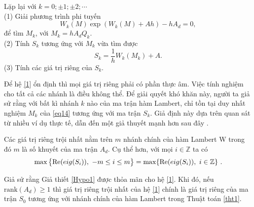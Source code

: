 \begin{tht} \label{tht1}
	Lặp lại với $k = 0;\pm 1; \pm2; \cdots$\\
	(1) Giải phương trình phi tuyến
	\begin{equation}\label{eq14}
		W_k(M)\exp (W_k(M)+Ah)-h A_d=0,
	\end{equation}
	để tìm $M_k$, với $M_k = h A_d Q_k$.\\
	(2) Tính $S_k$ tương ứng với $M_k$ vừa tìm được
	\begin{equation}\label{eq15}
		S_k= \dfrac{1}{h }W_k(M_k)+A.
	\end{equation}
	(3) Tính các giá trị riêng của $S_k$.
\end{tht}

\noindent Để hệ \eqref{1} ổn định thì mọi giá trị riêng phải có phần thực âm. Việc tính nghiệm cho tất cả các nhánh là điều không thể. Để giải quyết khó khăn này, người ta giả sử rằng với bất kì nhánh $k$ nào của ma trận hàm Lambert, chỉ tồn tại duy nhất nghiệm $M_k$ của \eqref{eq14} tương ứng với ma trận $S_k$. Giả định này dựa trên quan sát từ nhiều ví dụ thực tế, dẫn đến một giả thuyết mạnh hơn sau đây \cite{Yi10,YiJune12}.

\begin{gth}\label{Hypo1}
Các giá trị riêng trội nhất nằm trên $m$ nhánh chính của hàm Lambert W trong đó $m$ là số khuyết của ma trận $A_d$. Cụ thể hơn, với mọi $i \in \mathbb{Z}$ ta có
\begin{equation}\label{hypothesis}
\max  \left\{ \mathrm{Re}(eig(S_i)), \ -m\leq i \leq m \right\} = \max \{ \mathrm{Re}(eig(S_i)), \ i\in\mathbb{Z} \} \ .  
\end{equation}
\end{gth}

\begin{hqua} Giả sử rằng Giả thiết \ref{Hypo1} được thỏa mãn cho hệ \eqref{1}. Khi đó, nếu $\mathrm{rank}(A_d) \geq 1$ 
thì giá trị riêng trội nhất của hệ \eqref{1} chính là giá trị riêng của ma trận $S_0$ tương ứng với nhánh chính của hàm Lambert trong Thuật toán \ref{tht1}.
\end{hqua}

